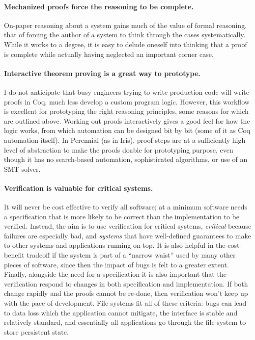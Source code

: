 \paragraph{Mechanized proofs force the reasoning to be complete.} On-paper
reasoning about a system gains much of the value of formal reasoning, that of
forcing the author of a system to think through the cases systematically. While
it works to a degree, it is easy to delude oneself into thinking that a proof is
complete while actually having neglected an important corner case.

\paragraph{Interactive theorem proving is a great way to prototype.} I do not
anticipate that busy engineers trying to write production code will write proofs
in Coq, much less develop a custom program logic. However, this workflow is
excellent for prototyping the right reasoning principles, some reasons for which
are outlined above. Working out proofs interactively gives a good feel for how
the logic works, from which automation can be designed bit by bit (some of it as
Coq automation itself). In Perennial (as in Iris), proof steps are at a
sufficiently high level of abstraction to make the proofs doable for prototyping
purpose, even though it has no search-based automation, sophisticated
algorithms, or use of an SMT solver.

\paragraph{Verification is valuable for critical systems.} It will never be cost
effective to verify all software; at a minimum software needs a specification
that is more likely to be correct than the implementation to be verified.
Instead, the aim is to use verification for critical systems, \emph{critical}
because failures are especially bad, and \emph{systems} that have well-defined
guarantees to make to other systems and applications running on top. It is also
helpful in the cost-benefit tradeoff if the system is part of a ``narrow waist''
used by many other pieces of software, since then the impact of bugs is felt to
a greater extent. Finally, alongside the need for a specification it is also
important that the verification respond to changes in both specification and
implementation. If both change rapidly and the proofs cannot be re-done, then
verification won't keep up with the pace of development. File systems fit all of
these criteria: bugs can lead to data loss which the application cannot
mitigate, the interface is stable and relatively standard, and essentially all
applications go through the file system to store persistent state.



